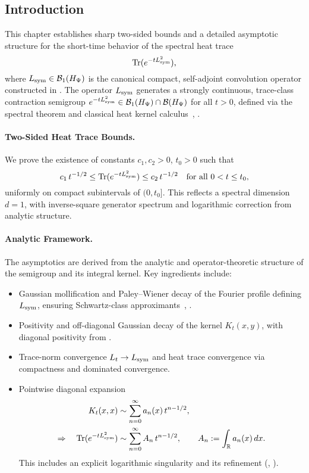 \subsection*{Introduction}
\label{sec:intro_heat_kernel_asymptotics}

This chapter establishes sharp two-sided bounds and a detailed asymptotic structure for the short-time behavior of the spectral heat trace
\[
\operatorname{Tr}(e^{-t L_{\mathrm{sym}}^2}),
\]
where \( L_{\mathrm{sym}} \in \mathcal{B}_1(H_{\Psi}) \) is the canonical compact, self-adjoint convolution operator constructed in . The operator \( L_{\mathrm{sym}} \) generates a strongly continuous, trace-class contraction semigroup \( e^{-tL_{\mathrm{sym}}^2} \in \mathcal{B}_1(H_{\Psi}) \cap \mathcal{B}(H_{\Psi}) \) for all \( t > 0 \), defined via the spectral theorem and classical heat kernel calculus~\cite[Ch.~X]{ReedSimon1978IV}, \cite[Ch.~3]{Simon2005TraceIdeals}.

\paragraph{Two-Sided Heat Trace Bounds.}
We prove the existence of constants \( c_1, c_2 > 0 \), \( t_0 > 0 \) such that
\[
c_1\, t^{-1/2} \le \operatorname{Tr}(e^{-t L_{\mathrm{sym}}^2}) \le c_2\, t^{-1/2}
\quad \text{for all } 0 < t \le t_0,
\]
uniformly on compact subintervals of \( (0, t_0] \). This reflects a spectral dimension \( d = 1 \), with inverse-square generator spectrum and logarithmic correction from analytic structure.

\paragraph{Analytic Framework.}
The asymptotics are derived from the analytic and operator-theoretic structure of the semigroup and its integral kernel. Key ingredients include:
\begin{itemize}
  \item Gaussian mollification and Paley--Wiener decay of the Fourier profile defining \( L_{\mathrm{sym}} \), ensuring Schwartz-class approximants~\cite[Ch.~IX]{ReedSimon1975II}, \cite[Ch.~9]{Levin1996EntireLectures}.
  \item Positivity and off-diagonal Gaussian decay of the kernel \( K_t(x, y) \), with diagonal positivity from .
  \item Trace-norm convergence \( L_t \to L_{\mathrm{sym}} \) and heat trace convergence via compactness and dominated convergence.
  \item Pointwise diagonal expansion
  \[
  \begin{aligned}
  K_t(x,x) &\sim \sum_{n=0}^\infty a_n(x)\, t^{n - 1/2}, \\
  \Rightarrow \quad
  \operatorname{Tr}(e^{-t L_{\mathrm{sym}}^2}) &\sim \sum_{n=0}^\infty A_n\, t^{n - 1/2},
  \qquad A_n := \int_{\mathbb{R}} a_n(x)\, dx.
  \end{aligned}
  \]
  This includes an explicit logarithmic singularity and its refinement (, ).
\end{itemize}

